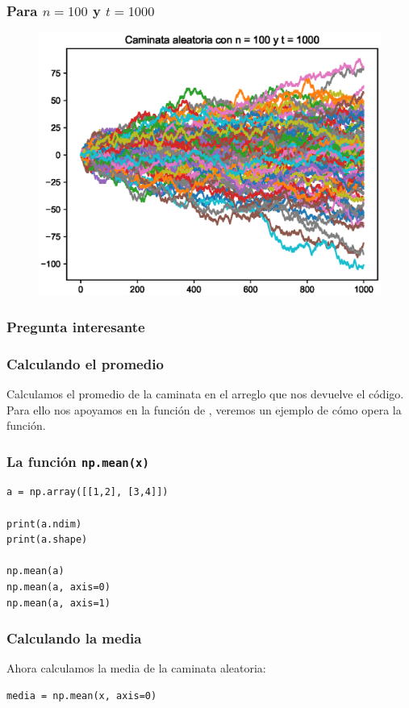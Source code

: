 \documentclass[12pt]{beamer}
\begin{document}
\begin{frame}
\frametitle{Para $n =  100$ y $t = 1000$}
\begin{figure}
    \includegraphics[scale=0.55]{Imagenes/plot_caminata_aleatoria_04.eps}
\end{figure}
\end{frame}
\begin{frame}
\frametitle{Pregunta interesante}
\begin{center}
\end{center}
\end{frame}
\begin{frame}
\frametitle{Calculando el promedio}
Calculamos el promedio de la caminata en el arreglo que nos devuelve el código.
\\
\bigskip
\pause
Para ello nos apoyamos en la función de , \pause veremos un ejemplo de cómo opera la función. 
\end{frame}
\begin{frame}[fragile]
\frametitle{La función \texttt{np.mean(x)}}
\begin{lstlisting}[caption=Manejando la función np.mean(x)]
a = np.array([[1,2], [3,4]])

print(a.ndim)
print(a.shape)

np.mean(a)
np.mean(a, axis=0)
np.mean(a, axis=1)
\end{lstlisting}
\end{frame}
\begin{frame}[fragile]
\frametitle{Calculando la media}
Ahora calculamos la media de la caminata aleatoria:
\pause
\begin{lstlisting}[caption=Calculando la media de la caminata]
media = np.mean(x, axis=0)
\end{lstlisting}
\end{frame}
\end{document}
